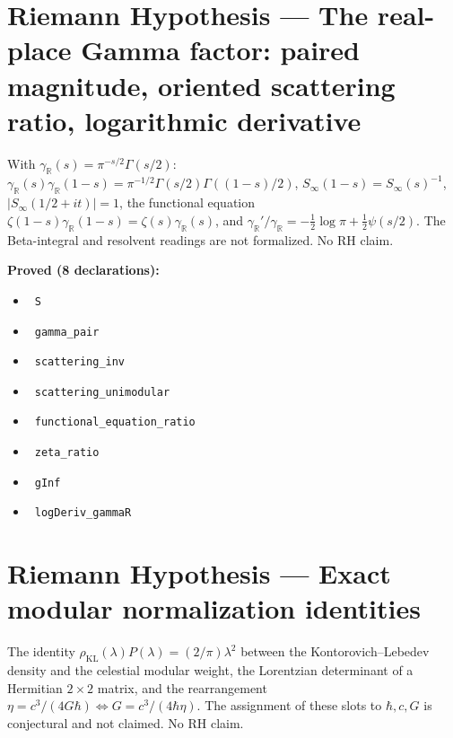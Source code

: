 \documentclass{report}
\theoremstyle{definition}
\begin{document}
\section{Riemann Hypothesis --- The real-place Gamma factor: paired magnitude, oriented scattering ratio, logarithmic derivative}
With $\gamma_\mathbb{R}(s)=\pi^{-s/2}\Gamma(s/2)$: $\gamma_\mathbb{R}(s)\gamma_\mathbb{R}(1-s)=\pi^{-1/2}\Gamma(s/2)\Gamma((1-s)/2)$, $S_\infty(1-s)=S_\infty(s)^{-1}$, $|S_\infty(1/2+it)|=1$, the functional equation $\zeta(1-s)\gamma_\mathbb{R}(1-s)=\zeta(s)\gamma_\mathbb{R}(s)$, and $\gamma_\mathbb{R}'/\gamma_\mathbb{R}=-\tfrac12\log\pi+\tfrac12\psi(s/2)$. The Beta-integral and resolvent readings are not formalized. No RH claim.

\noindent\textbf{Proved (8 declarations):}
\begin{itemize}
  \item {}\leanok\ \texttt{S}
  \item {}\leanok\ \texttt{gamma\_pair}
  \item {}\leanok\ \texttt{scattering\_inv}
  \item {}\leanok\ \texttt{scattering\_unimodular}
  \item {}\leanok\ \texttt{functional\_equation\_ratio}
  \item {}\leanok\ \texttt{zeta\_ratio}
  \item {}\leanok\ \texttt{gInf}
  \item {}\leanok\ \texttt{logDeriv\_gammaR}
\end{itemize}

\section{Riemann Hypothesis --- Exact modular normalization identities}
The identity $\rho_{\mathrm{KL}}(\lambda)P(\lambda)=(2/\pi)\lambda^2$ between the Kontorovich--Lebedev density and the celestial modular weight, the Lorentzian determinant of a Hermitian $2\times2$ matrix, and the rearrangement $\eta=c^3/(4G\hbar)\Leftrightarrow G=c^3/(4\hbar\eta)$. The assignment of these slots to $\hbar,c,G$ is conjectural and not claimed. No RH claim.
\end{document}
